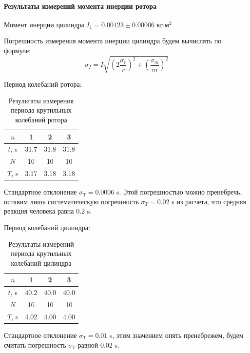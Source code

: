 \documentclass[a4paper,12pt]{article}
\begin{document}
	\paragraph{Результаты измерений момента инерции ротора}
	
	Момент инерции цилиндра $I_1 = 0.00123 \pm 0.00006$ кг$\cdot$м$^2$
	
	Погрешность измерения момента инерции цилиндра будем вычислять по формуле:
	\begin{equation}
		\label{sigmaI}
		\sigma_I=I\sqrt{\left(2\frac{\sigma_r}{r}\right)^2 + \left(\frac{\sigma_m}{m}\right)^2}
	\end{equation}
	
	Период колебаний ротора:
	
	\begin{table}[H]
		\centering
		\begin{tabular}{|c|c|c|c|}
			\hline
			$n$ & 1 & 2 & 3 \\
			\hline
			$t$, s & 31.7 & 31.8 & 31.8 \\
			\hline
			$N$ & 10 & 10 & 10 \\
			\hline
			$T$, s & 3.17 & 3.18 & 3.18 \\
			\hline
		\end{tabular}
		\caption{Результаты измерения периода крутильных колебаний ротора}
	\end{table}
	
	Стандартное отклонение $\sigma_T = 0.0006$ s. Этой погрешностью можно пренебречь, оставим лишь систематическую погрешность $\sigma_T=0.02$ s из расчета, что средняя реакция человека равна $0.2$ s.
	
	Период колебаний цилиндра:
	
	\begin{table}[H]
		\centering
		\begin{tabular}{|c|c|c|c|}
			\hline
			$n$ & 1 & 2 & 3 \\
			\hline
			$t$, s & 40.2 & 40.0 & 40.0 \\
			\hline
			$N$ & 10 & 10 & 10 \\
			\hline
			$T$, s & 4.02 & 4.00 & 4.00 \\
			\hline
		\end{tabular}
		\caption{Результаты измерений периода крутильных колебаний цилиндра}
	\end{table}
	
	Стандартное отклонение $\sigma_T = 0.01$ s, этим значением опять пренебрежем, будем считать погрешность $\sigma_T$ равной $0.02$ s.\\
	
\end{document}
